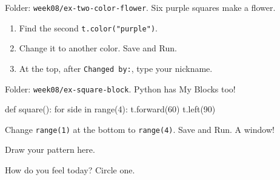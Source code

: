 \begin{exercise}
Folder: \texttt{week08/ex-two-color-flower}. Six purple squares make a flower.
\begin{enumerate}[leftmargin=1.4em,itemsep=2pt]
  \item Find the second \texttt{t.color("purple")}.
  \item Change it to another color. Save and Run.
  \item At the top, after \texttt{Changed by:}, type your nickname.
\end{enumerate}
\end{exercise}

\begin{exercise}
Folder: \texttt{week08/ex-square-block}. Python has My Blocks too!
\begin{center}
\begin{scratch}[scale=0.8]
\end{scratch}
\end{center}
\begin{pycode}
def square():
    for side in range(4):
        t.forward(60)
        t.left(90)
\end{pycode}
Change \texttt{range(1)} at the bottom to \texttt{range(4)}. Save and Run. A window!
\end{exercise}

\begin{vocab}
\end{vocab}

\begin{reflection}
Draw your pattern here.
\answerspace{4cm}

How do you feel today? Circle one.

\begin{center}
\Huge\faSmile[regular]\qquad\faMeh[regular]\qquad\faFrown[regular]
\end{center}
\end{reflection}
